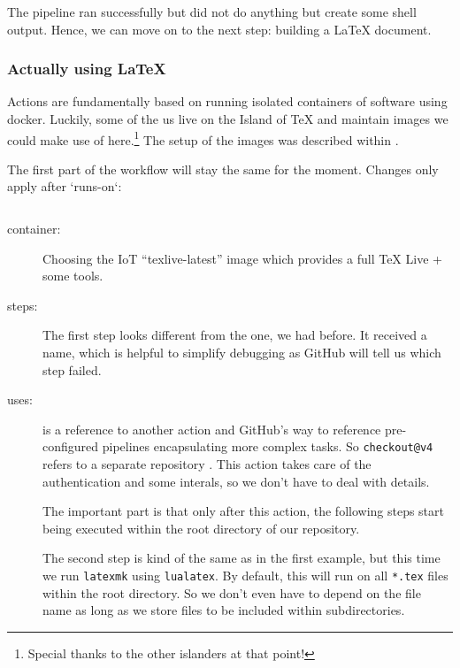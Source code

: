 \documentclass[final]{ltugboat}
\newcommand*{\action}[1]{\texttt{#1}}
\newcommand*{\command}[1]{\texttt{#1}}
\newcommand*{\file}[1]{\texttt{#1}}
\newcommand*{\containerimage}[1]{\enquote{#1}}
\begin{document}
The pipeline ran successfully but did not do anything but create some shell output.
Hence, we can move on to the next step: building a \LaTeX{} document.

\subsubsection{Actually using \LaTeX}

Actions are fundamentally based on running isolated containers of software using docker.
Luckily, some of the us live on the Island of TeX and maintain images we could make use of here.\footnote{Special thanks to the other islanders at that point!}
The setup of the images was described within \cite{islandoftex-docker-gitlab}.

The first part of the workflow will stay the same for the moment.
Changes only apply after `runs-on`:

\inputminted[firstline=5, lastline=12,gobble=3]{yaml}{examples/latex-basic.yml}


\begin{description}
\item[container:] Choosing the IoT \containerimage{texlive-latest} image which provides a full TeX Live + some tools\cite{islandoftex-docker}.
\item[steps:]
The first step looks different from the one, we had before.
It received a name, which is helpful to simplify debugging as GitHub will tell us which step failed.

\item[uses:] is a reference to another action and GitHub's way to reference pre-configured pipelines encapsulating more complex tasks.
So \action{checkout@v4} refers to a separate repository \cite{github-action-checkout}.
This action takes care of the authentication and some interals, so we don't have to deal with details.

The important part is that only after this action, the following steps start being executed within the root directory of our repository.

The second step is kind of the same as in the first example, but this time we run \command{latexmk}\cite{latexmk} using \command{lualatex}.
By default, this will run on all \file{*.tex} files within the root directory.
So we don't even have to depend on the file name as long as we store files to be included within subdirectories.
\end{description}
\end{document}
